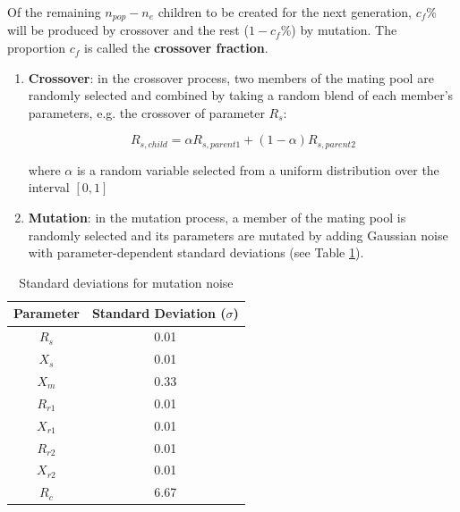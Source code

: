 \documentclass{article}
\begin{document}
Of the remaining $n_{pop} - n_{e}$ children to be created for the next generation, $c_{f}$\% will be produced by crossover and the rest ($1 - c_{f}$\%) by mutation. The proportion $c_{f}$ is called the \textbf{crossover fraction}.

\begin{enumerate}

\item \textbf{Crossover}: in the crossover process, two members of the mating pool are randomly selected and combined by taking a random blend of each member's parameters, e.g. the crossover of parameter $R_{s}$:

\begin{equation}
	R_{s, child} = \alpha R_{s, parent 1} + (1 - \alpha) R_{s, parent 2}
\end{equation}

\noindent where $\alpha$ is a random variable selected from a uniform distribution over the interval $[0,1]$

\item \textbf{Mutation}: in the mutation process, a member of the mating pool is randomly selected and its parameters are mutated by adding Gaussian noise with parameter-dependent standard deviations (see Table \ref{tab:ga_mutation}).

\end{enumerate}

\begin{table}[htp]
	\renewcommand{\arraystretch}{1.3}
	\begin{center}
	\begin{tabular}{|c|c|}
        \hline
		  Parameter & Standard Deviation ($\sigma$) \\ \hline
        $R_{s}$  	& 0.01  	\\ \hline
        $X_{s}$  	& 0.01  	\\ \hline
        $X_{m}$  	& 0.33 	\\ \hline
        $R_{r1}$  	& 0.01  \\ \hline
        $X_{r1}$  	& 0.01  	\\ \hline
        $R_{r2}$  	& 0.01  	\\ \hline
        $X_{r2}$  	& 0.01  	\\ \hline
        $R_{c}$  	& 6.67  	\\ \hline
    \end{tabular}
	\caption{Standard deviations for mutation noise}
	\label{tab:ga_mutation}
	\end{center}
\end{table}
\end{document}

